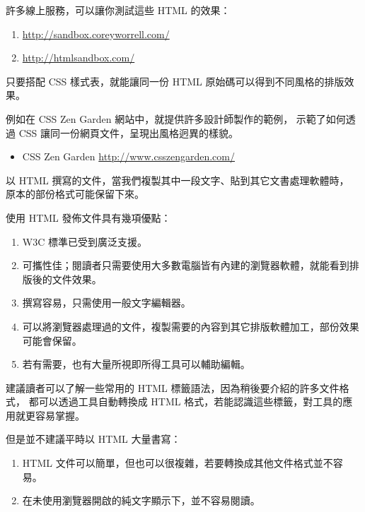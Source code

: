 \documentclass[a4paper,12pt,english]{sphinxmanual}
\begin{document}
許多線上服務，可以讓你測試這些 HTML 的效果：
\begin{enumerate}
\item {} 
\href{http://sandbox.coreyworrell.com/}{http://sandbox.coreyworrell.com/}

\item {} 
\href{http://htmlsandbox.com/}{http://htmlsandbox.com/}

\end{enumerate}

只要搭配 CSS 樣式表，就能讓同一份 HTML 原始碼可以得到不同風格的排版效果。

例如在 CSS Zen Garden 網站中，就提供許多設計師製作的範例，
示範了如何透過 CSS 讓同一份網頁文件，呈現出風格迥異的樣貌。
\begin{itemize}
\item {} 
CSS Zen Garden \href{http://www.csszengarden.com/}{http://www.csszengarden.com/}

\end{itemize}

以 HTML 撰寫的文件，當我們複製其中一段文字、貼到其它文書處理軟體時，
原本的部份格式可能保留下來。

使用 HTML 發佈文件具有幾項優點：
\begin{enumerate}
\item {} 
W3C 標準已受到廣泛支援。

\item {} 
可攜性佳；閱讀者只需要使用大多數電腦皆有內建的瀏覽器軟體，就能看到排版後的文件效果。

\item {} 
撰寫容易，只需使用一般文字編輯器。

\item {} 
可以將瀏覽器處理過的文件，複製需要的內容到其它排版軟體加工，部份效果可能會保留。

\item {} 
若有需要，也有大量所視即所得工具可以輔助編輯。

\end{enumerate}

建議讀者可以了解一些常用的 HTML 標籤語法，因為稍後要介紹的許多文件格式，
都可以透過工具自動轉換成 HTML 格式，若能認識這些標籤，對工具的應用就更容易掌握。

但是並不建議平時以 HTML 大量書寫：
\begin{enumerate}
\item {} 
HTML 文件可以簡單，但也可以很複雜，若要轉換成其他文件格式並不容易。

\item {} 
在未使用瀏覽器開啟的純文字顯示下，並不容易閱讀。

\end{enumerate}
\end{document}

